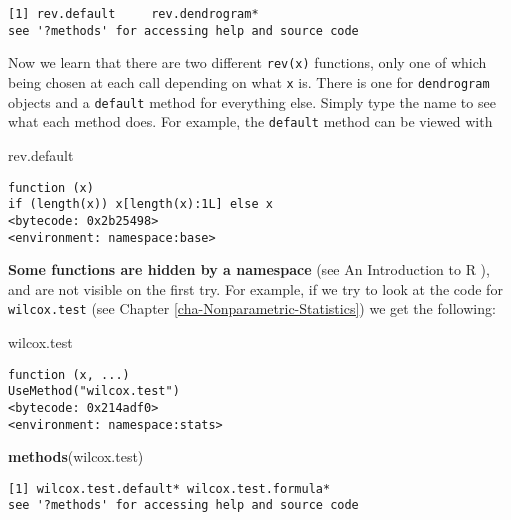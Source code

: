 \documentclass[]{book}
\newenvironment{Shaded}{\begin{snugshade}}{\end{snugshade}}
\newcommand{\KeywordTok}[1]{\textcolor[rgb]{0.13,0.29,0.53}{\textbf{{#1}}}}
\newcommand{\NormalTok}[1]{{#1}}
\numberwithin{equation}{chapter}
\numberwithin{figure}{chapter}
\theoremstyle{plain}
\theoremstyle{definition}
\theoremstyle{remark}
\theoremstyle{definition}
\theoremstyle{definition}
\theoremstyle{remark}
\begin{document}
\begin{verbatim}
[1] rev.default     rev.dendrogram*
see '?methods' for accessing help and source code
\end{verbatim}

Now we learn that there are two different \texttt{rev(x)} functions,
only one of which being chosen at each call depending on what \texttt{x}
is. There is one for \texttt{dendrogram} objects and a \texttt{default}
method for everything else. Simply type the name to see what each method
does. For example, the \texttt{default} method can be viewed with

\begin{Shaded}
\begin{Highlighting}[]
\NormalTok{rev.default}
\end{Highlighting}
\end{Shaded}

\begin{verbatim}
function (x) 
if (length(x)) x[length(x):1L] else x
<bytecode: 0x2b25498>
<environment: namespace:base>
\end{verbatim}

\textbf{Some functions are hidden by a namespace} (see An Introduction
to R \textcite{Venables2010}), and are not visible on the first try. For
example, if we try to look at the code for \texttt{wilcox.test}
 (see Chapter
\ref{cha-Nonparametric-Statistics}) we get the following:

\begin{Shaded}
\begin{Highlighting}[]
\NormalTok{wilcox.test}
\end{Highlighting}
\end{Shaded}

\begin{verbatim}
function (x, ...) 
UseMethod("wilcox.test")
<bytecode: 0x214adf0>
<environment: namespace:stats>
\end{verbatim}

\begin{Shaded}
\begin{Highlighting}[]
\KeywordTok{methods}\NormalTok{(wilcox.test)}
\end{Highlighting}
\end{Shaded}

\begin{verbatim}
[1] wilcox.test.default* wilcox.test.formula*
see '?methods' for accessing help and source code
\end{verbatim}
\end{document}
